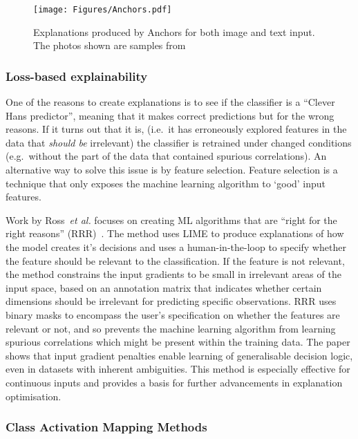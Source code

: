 \begin{figure}[ht!]
	\begin{center}
		\texttt{[image: Figures/Anchors.pdf]}
	\end{center}
	\caption{Explanations produced by Anchors for both image and text input. The photos shown are samples from~\cite{Ribeiro0G18}}
	\label{Fig:Anchors}
\end{figure} 



\subsubsection{Loss-based explainability}

One of the reasons to create explanations is to see if the classifier is a ``Clever Hans predictor'', meaning that it makes correct predictions but for the wrong reasons. If it turns out that it is, (i.e.\ it has erroneously explored features in the data that \textit{should be} irrelevant) the classifier is retrained under changed conditions (e.g.\ without the part of the data that contained spurious correlations). An alternative way to solve this issue is by feature selection. Feature selection is a technique that only exposes the machine learning algorithm to ‘good’ input features.

Work by Ross~\textit{et al.} focuses on creating ML algorithms that are “right for the right reasons” (RRR)~\cite{RossHD17}. The method uses LIME to produce explanations of how the model creates it's decisions and uses a human-in-the-loop to specify whether the feature should be relevant to the classification. If the feature is not relevant, the method constrains the input gradients to be small in irrelevant areas of the input space, based on an annotation matrix that indicates whether certain dimensions should be irrelevant for predicting specific observations. RRR uses binary masks to encompass the user's specification on whether the features are relevant or not, and so prevents the machine learning algorithm from learning spurious correlations which might be present within the training data. The paper shows that input gradient penalties enable learning of generalisable decision logic, even in datasets with inherent ambiguities. This method is especially effective for continuous inputs and provides a basis for further advancements in explanation optimisation.



\subsubsection{Class Activation Mapping Methods}
\label{cam}

